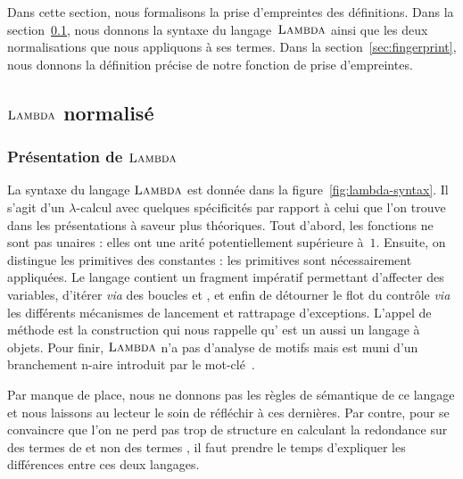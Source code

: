 
Dans cette section, nous formalisons la prise d'empreintes des
définitions. Dans la section~\ref{sec:lambda}, nous donnons la syntaxe
du langage~$\textsc{Lambda}$ ainsi que les deux normalisations que nous
appliquons à ses termes. Dans la section~\ref{sec:fingerprint},
nous donnons la définition précise de notre fonction de prise
d'empreintes.

\subsection{$\textsc{Lambda}$ normalisé}
\label{sec:lambda}

\subsubsection{Présentation de $\textsc{Lambda}$}



La syntaxe du langage $\textsc{Lambda}$ est donnée dans la
figure~\ref{fig:lambda-syntax}. Il s'agit d'un $\lambda$-calcul avec
quelques spécificités par rapport à celui que l'on trouve dans les
présentations à saveur plus théoriques. Tout d'abord, les fonctions ne
sont pas unaires : elles ont une arité potentiellement supérieure
à~$1$. Ensuite, on distingue les primitives des constantes : les
primitives sont nécessairement appliquées. Le langage contient un
fragment impératif permettant d'affecter des variables, d'itérer
\textit{via} des boucles  et , et enfin de
détourner le flot du contrôle \textit{via} les différents mécanismes
de lancement et rattrapage d'exceptions. L'appel de méthode est la
construction qui nous rappelle qu'{\OCaml} est un aussi un langage à
objets. Pour finir, $\textsc{Lambda}$ n'a pas d'analyse de motifs mais est
muni d'un branchement n-aire introduit par le mot-clé~.

Par manque de place, nous ne donnons pas les règles de sémantique de
ce langage et nous laissons au lecteur le soin de réfléchir à ces
dernières. Par contre, pour se convaincre que l'on ne perd pas trop de
structure en calculant la redondance sur des termes de {\LambdaCode}
et non des termes {\OCaml}, il faut prendre le temps d'expliquer les
différences entre ces deux langages.

